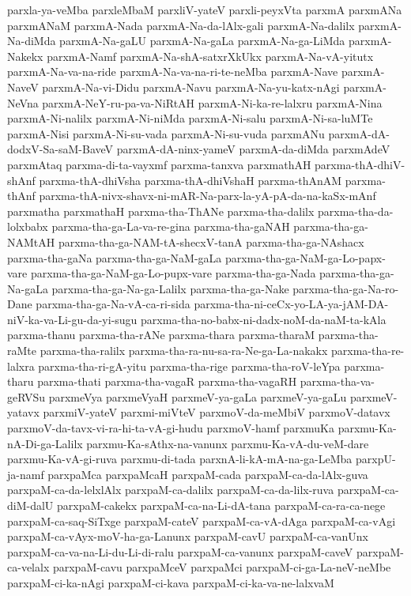 {parxla-ya-veMba
parxleMbaM
parxliV-yateV
parxli-peyxVta
parxmA
parxmANa
parxmANaM
parxmA-Nada
parxmA-Na-da-lAlx-gali
parxmA-Na-dalilx
parxmA-Na-diMda
parxmA-Na-gaLU
parxmA-Na-gaLa
parxmA-Na-ga-LiMda
parxmA-Nakekx
parxmA-Namf
parxmA-Na-shA-satxrXkUkx
parxmA-Na-vA-yitutx
parxmA-Na-va-na-ride
parxmA-Na-va-na-ri-te-neMba
parxmA-Nave
parxmA-NaveV
parxmA-Na-vi-Didu
parxmA-Navu
parxmA-Na-yu-katx-nAgi
parxmA-NeVna
parxmA-NeY-ru-pa-va-NiRtAH
parxmA-Ni-ka-re-lalxru
parxmA-Nina
parxmA-Ni-nalilx
parxmA-Ni-niMda
parxmA-Ni-salu
parxmA-Ni-sa-luMTe
parxmA-Nisi
parxmA-Ni-su-vada
parxmA-Ni-su-vuda
parxmANu
parxmA-dA-dodxV-Sa-saM-BaveV
parxmA-dA-ninx-yameV
parxmA-da-diMda
parxmAdeV
parxmAtaq
parxma-di-ta-vayxmf
parxma-tanxva
parxmathAH
parxma-thA-dhiV-shAnf
parxma-thA-dhiVsha
parxma-thA-dhiVshaH
parxma-thAnAM
parxma-thAnf
parxma-thA-nivx-shavx-ni-mAR-Na-parx-la-yA-pA-da-na-kaSx-mAnf
parxmatha
parxmathaH
parxma-tha-ThANe
parxma-tha-dalilx
parxma-tha-da-lolxbabx
parxma-tha-ga-La-va-re-gina
parxma-tha-gaNAH
parxma-tha-ga-NAMtAH
parxma-tha-ga-NAM-tA-shecxV-tanA
parxma-tha-ga-NAshacx
parxma-tha-gaNa
parxma-tha-ga-NaM-gaLa
parxma-tha-ga-NaM-ga-Lo-papx-vare
parxma-tha-ga-NaM-ga-Lo-pupx-vare
parxma-tha-ga-Nada
parxma-tha-ga-Na-gaLa
parxma-tha-ga-Na-ga-Lalilx
parxma-tha-ga-Nake
parxma-tha-ga-Na-ro-Dane
parxma-tha-ga-Na-vA-ca-ri-sida
parxma-tha-ni-ceCx-yo-LA-ya-jAM-DA-niV-ka-va-Li-gu-da-yi-sugu
parxma-tha-no-babx-ni-dadx-noM-da-naM-ta-kAla
parxma-thanu
parxma-tha-rANe
parxma-thara
parxma-tharaM
parxma-tha-raMte
parxma-tha-ralilx
parxma-tha-ra-nu-sa-ra-Ne-ga-La-nakakx
parxma-tha-re-lalxra
parxma-tha-ri-gA-yitu
parxma-tha-rige
parxma-tha-roV-leYpa
parxma-tharu
parxma-thati
parxma-tha-vagaR
parxma-tha-vagaRH
parxma-tha-va-geRVSu
parxmeVya
parxmeVyaH
parxmeV-ya-gaLa
parxmeV-ya-gaLu
parxmeV-yatavx
parxmiV-yateV
parxmi-miVteV
parxmoV-da-meMbiV
parxmoV-datavx
parxmoV-da-tavx-vi-ra-hi-ta-vA-gi-hudu
parxmoV-hamf
parxmuKa
parxmu-Ka-nA-Di-ga-Lalilx
parxmu-Ka-sAthx-na-vanunx
parxmu-Ka-vA-du-veM-dare
parxmu-Ka-vA-gi-ruva
parxmu-di-tada
parxnA-li-kA-mA-na-ga-LeMba
parxpU-ja-namf
parxpaMca
parxpaMcaH
parxpaM-cada
parxpaM-ca-da-lAlx-guva
parxpaM-ca-da-lelxlAlx
parxpaM-ca-dalilx
parxpaM-ca-da-lilx-ruva
parxpaM-ca-diM-dalU
parxpaM-cakekx
parxpaM-ca-na-Li-dA-tana
parxpaM-ca-ra-ca-nege
parxpaM-ca-saq-SiTxge
parxpaM-cateV
parxpaM-ca-vA-dAga
parxpaM-ca-vAgi
parxpaM-ca-vAyx-moV-ha-ga-Lanunx
parxpaM-cavU
parxpaM-ca-vanUnx
parxpaM-ca-va-na-Li-du-Li-di-ralu
parxpaM-ca-vanunx
parxpaM-caveV
parxpaM-ca-velalx
parxpaM-cavu
parxpaMceV
parxpaMci
parxpaM-ci-ga-La-neV-neMbe
parxpaM-ci-ka-nAgi
parxpaM-ci-kava
parxpaM-ci-ka-va-ne-lalxvaM
}
